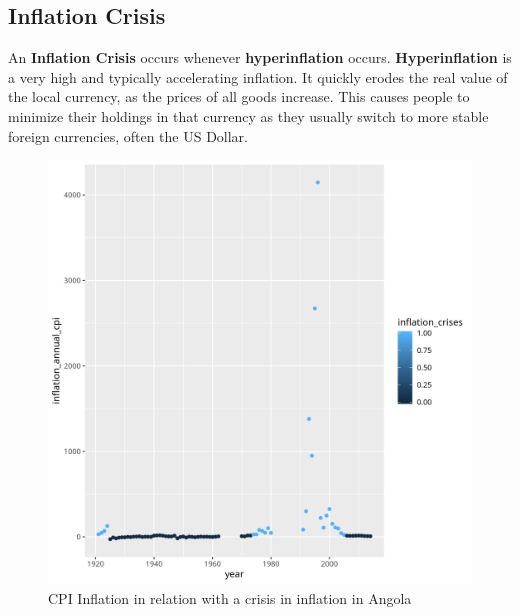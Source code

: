 \documentclass{article}
\begin{document}
    \newpage
    \subsection{ Inflation Crisis }
    An \textbf{Inflation Crisis} occurs whenever \textbf{hyperinflation} occurs. 
    \textbf{Hyperinflation} is a very high and typically accelerating inflation. 
    It quickly erodes the real value of the local currency, 
    as the prices  of all goods increase. 
    This causes people to minimize their holdings in that currency as they usually 
    switch to more stable foreign currencies, often the US Dollar.

    \begin{figure}[h!]
        \caption{ CPI Inflation in relation with a crisis in inflation in Angola}
        \includegraphics[scale=0.7]{plot3_angola.png}
    \end{figure}
    
    \newpage
    
\end{document}
